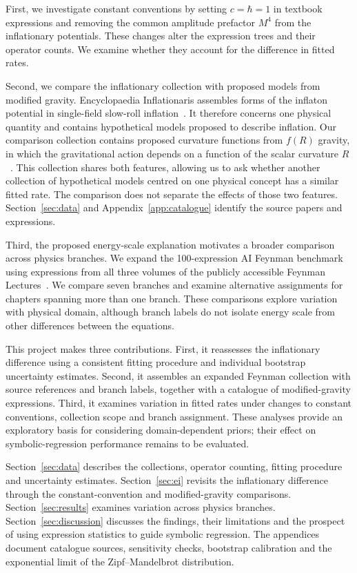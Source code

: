 \documentclass[10pt]{article}
\begin{document}
First, we investigate constant conventions by setting $c=\hbar=1$ in textbook expressions and removing the common amplitude prefactor $M^4$ from the inflationary potentials. These changes alter the expression trees and their operator counts. We examine whether they account for the difference in fitted rates.

Second, we compare the inflationary collection with proposed models from modified gravity. Encyclopaedia Inflationaris assembles forms of the inflaton potential in single-field slow-roll inflation~\citep{martin2014}. It therefore concerns one physical quantity and contains hypothetical models proposed to describe inflation. Our comparison collection contains proposed curvature functions from $f(R)$ gravity, in which the gravitational action depends on a function of the scalar curvature $R$~\citep{sotiriou2010}. This collection shares both features, allowing us to ask whether another collection of hypothetical models centred on one physical concept has a similar fitted rate. The comparison does not separate the effects of those two features. Section~\ref{sec:data} and Appendix~\ref{app:catalogue} identify the source papers and expressions.

Third, the proposed energy-scale explanation motivates a broader comparison across physics branches. We expand the 100-expression AI Feynman benchmark~\citep{udrescu2020} using expressions from all three volumes of the publicly accessible Feynman Lectures~\citep{feynman}. We compare seven branches and examine alternative assignments for chapters spanning more than one branch. These comparisons explore variation with physical domain, although branch labels do not isolate energy scale from other differences between the equations.

This project makes three contributions. First, it reassesses the inflationary difference using a consistent fitting procedure and individual bootstrap uncertainty estimates. Second, it assembles an expanded Feynman collection with source references and branch labels, together with a catalogue of \nfR{} modified-gravity expressions. Third, it examines variation in fitted rates under changes to constant conventions, collection scope and branch assignment. These analyses provide an exploratory basis for considering domain-dependent priors; their effect on symbolic-regression performance remains to be evaluated.

Section~\ref{sec:data} describes the collections, operator counting, fitting procedure and uncertainty estimates. Section~\ref{sec:ei} revisits the inflationary difference through the constant-convention and modified-gravity comparisons. Section~\ref{sec:results} examines variation across physics branches. Section~\ref{sec:discussion} discusses the findings, their limitations and the prospect of using expression statistics to guide symbolic regression. The appendices document catalogue sources, sensitivity checks, bootstrap calibration and the exponential limit of the Zipf--Mandelbrot distribution.
\end{document}
